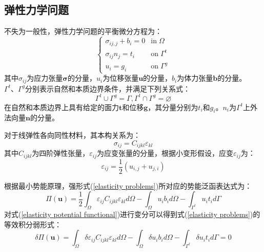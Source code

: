 \subsection{弹性力学问题}
不失为一般性，弹性力学问题的平衡微分方程为：
\begin{equation}\label{elasticity problems}
\begin{cases}
    \sigma_{ij,j}+b_i=0&\text{in}\;\Omega\\
    \sigma_{ij}n_j=t_i&\text{on}\;\Gamma^t\\
    u_i=g_i&\text{on}\;\Gamma^g
\end{cases}
\end{equation}
其中$\sigma_{ij}$为应力张量$\pmb \sigma$的分量，$u_i$为位移张量$\pmb{u}$的分量，$b_i$为体力张量$\pmb{b}$的分量。$\Gamma^t \text{、}\Gamma^g$分别表示自然和本质边界条件，并满足下列关系式：
\begin{equation}\label{EGeometric relationships}
\Gamma^t\cup \Gamma^g=\Gamma,\Gamma^t\cap \Gamma^g=\varnothing
\end{equation}
在自然和本质边界上具有给定的面力$\pmb{t}$和位移$\pmb{g}$，其分量分别为$t_i$和$g_i$。$n_i$为$\Gamma^{t}$上外法向量$\pmb{n}$的分量。\par
对于线弹性各向同性材料，其本构关系为：
\begin{equation}\label{constitutive relation}
    \sigma_{ij}=C_{ijkl}\varepsilon_{kl}
\end{equation}
其中$C_{ijkl}$为四阶弹性张量，$\varepsilon_{ij}$为应变张量的分量，根据小变形假设，应变$\varepsilon_{ij}$为：
\begin{equation}\label{CH2-strain}
    \varepsilon_{ij}=\frac{1}{2}(u_{i,j}+u_{j,i})
\end{equation} \par
根据最小势能原理，强形式(\ref{elasticity problems})所对应的势能泛函表达式为：
\begin{equation}\label{elasticity potential functional}
    \Pi(\pmb{u})=\frac{1}{2}\int_{\Omega}\varepsilon_{ij}C_{ijkl}\varepsilon_{kl}d\Omega-\int_{\Omega}u_ib_id\Omega-\int_{\Gamma^t}u_it_id\Gamma
\end{equation}
对式(\ref{elasticity potential functional})进行变分可以得到式(\ref{elasticity problems})的等效积分弱形式：
\begin{equation}\label{elasticity weak form}
    \delta\Pi(\pmb{u})=\int_{\Omega}\delta\varepsilon_{ij}C_{ijkl}\varepsilon_{kl}d\Omega-\int_{\Omega}\delta u_ib_id\Omega-\int_{\Gamma^t}\delta u_it_id\Gamma=0
\end{equation}\par
